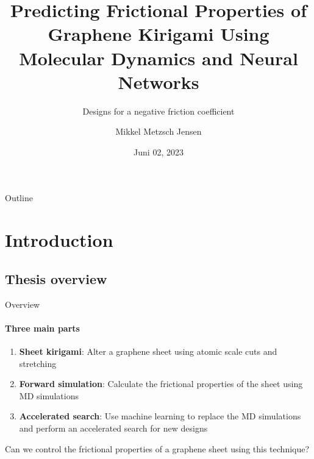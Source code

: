\documentclass[
	10pt, %
]{beamer}
\title[Predicting Graphene Kirigami Friction]{Predicting Frictional Properties of Graphene Kirigami Using Molecular Dynamics and Neural Networks}
\subtitle{Designs for a negative friction coefficient}
\author[Mikkel Metzsch Jensen]{Mikkel Metzsch Jensen}
\institute[UiO]{University of Oslo}
\date[Juni 02, 2023]{Juni 02, 2023}
\begin{document}

\begin{frame}
	\titlepage %
\end{frame}


\begin{frame}{Outline}
    \tableofcontents
\end{frame}


\section{Introduction} %
\subsection{Thesis overview}

\begin{frame}{Overview}
	\framesubtitle{Three main parts}
	
	\begin{enumerate}
		\setlength\itemsep{1em}
		\item \textbf{Sheet kirigami}: Alter a graphene sheet using atomic scale cuts and stretching
		\item \textbf{Forward simulation}: Calculate the frictional properties of the sheet using MD simulations
		\item \textbf{Accelerated search}: Use machine learning to replace the MD simulations and perform an accelerated search for new designs
	\end{enumerate}
	\vspace{2mm}
	
	Can we control the frictional properties of a graphene sheet using this technique?
	
\end{frame}
\end{document}
